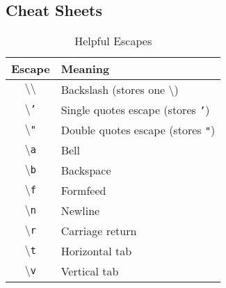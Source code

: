 \documentclass[a4paper,11pt]{book}
\numberwithin{figure}{chapter}
\numberwithin{table}{chapter}
\begin{document}
\clearpage

\begin{appendices}
\appendixpage
\noappendicestocpagenum
\addappheadtotoc

\chapter{Cheat Sheets}

\begin{table}[!htbp]
\centering
\caption{Helpful Escapes}
\label{tab:helpful_escapes}
	\begin{tabular}{cl}
		\toprule \toprule
		Escape & Meaning \\
		\midrule
		\texttt{$\setminus\setminus$} & Backslash (stores one $\setminus$) \\
		\texttt{$\setminus$'} & Single quotes escape (stores \texttt{'})\\
		\texttt{$\setminus$"} & Double quotes escape (stores \texttt{"})\\
		\texttt{$\setminus$a} & Bell \\
		\texttt{$\setminus$b} & Backspace \\
		\texttt{$\setminus$f} & Formfeed \\
		\texttt{$\setminus$n} & Newline \\
		\texttt{$\setminus$r} & Carriage return \\
		\texttt{$\setminus$t} & Horizontal tab \\
		\texttt{$\setminus$v} & Vertical tab \\
		\bottomrule
	\end{tabular}
\end{table}


\end{appendices}
\end{document}
